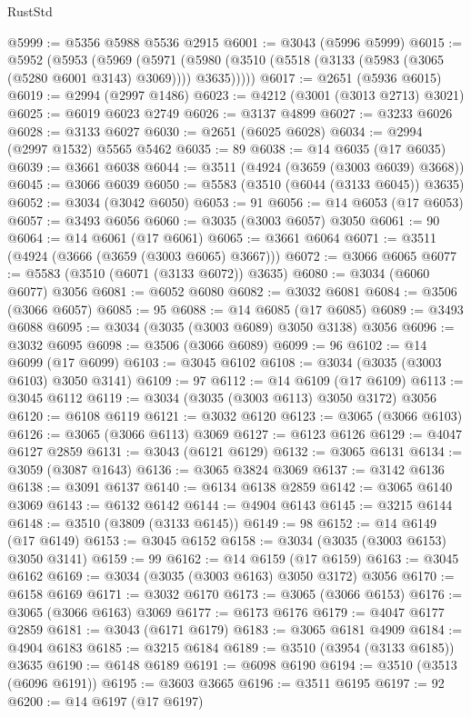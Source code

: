 \begin{lexlean}{RustStd}
\begin{coremodule}
@5999 := @5356 @5988 @5536 @2915
@6001 := @3043 (@5996 @5999)
@6015 := @5952
    (@5953
      (@5969
        (@5971 (@5980 (@3510 (@5518 (@3133 (@5983 (@3065 (@5280 @6001 @3143) @3069)))) @3635)))))
@6017 := @2651 (@5936 @6015)
@6019 := @2994 (@2997 @1486)
@6023 := @4212 (@3001 (@3013 @2713) @3021)
@6025 := @6019 @6023 @2749
@6026 := @3137 @4899
@6027 := @3233 @6026
@6028 := @3133 @6027
@6030 := @2651 (@6025 @6028)
@6034 := @2994 (@2997 @1532) @5565 @5462
@6035 := 89
@6038 := @14 @6035 (@17 @6035)
@6039 := @3661 @6038
@6044 := @3511 (@4924 (@3659 (@3003 @6039) @3668))
@6045 := @3066 @6039
@6050 := @5583 (@3510 (@6044 (@3133 @6045)) @3635)
@6052 := @3034 (@3042 @6050)
@6053 := 91
@6056 := @14 @6053 (@17 @6053)
@6057 := @3493 @6056
@6060 := @3035 (@3003 @6057) @3050
@6061 := 90
@6064 := @14 @6061 (@17 @6061)
@6065 := @3661 @6064
@6071 := @3511 (@4924 (@3666 (@3659 (@3003 @6065) @3667)))
@6072 := @3066 @6065
@6077 := @5583 (@3510 (@6071 (@3133 @6072)) @3635)
@6080 := @3034 (@6060 @6077) @3056
@6081 := @6052 @6080
@6082 := @3032 @6081
@6084 := @3506 (@3066 @6057)
@6085 := 95
@6088 := @14 @6085 (@17 @6085)
@6089 := @3493 @6088
@6095 := @3034 (@3035 (@3003 @6089) @3050 @3138) @3056
@6096 := @3032 @6095
@6098 := @3506 (@3066 @6089)
@6099 := 96
@6102 := @14 @6099 (@17 @6099)
@6103 := @3045 @6102
@6108 := @3034 (@3035 (@3003 @6103) @3050 @3141)
@6109 := 97
@6112 := @14 @6109 (@17 @6109)
@6113 := @3045 @6112
@6119 := @3034 (@3035 (@3003 @6113) @3050 @3172) @3056
@6120 := @6108 @6119
@6121 := @3032 @6120
@6123 := @3065 (@3066 @6103)
@6126 := @3065 (@3066 @6113) @3069
@6127 := @6123 @6126
@6129 := @4047 @6127 @2859
@6131 := @3043 (@6121 @6129)
@6132 := @3065 @6131
@6134 := @3059 (@3087 @1643)
@6136 := @3065 @3824 @3069
@6137 := @3142 @6136
@6138 := @3091 @6137
@6140 := @6134 @6138 @2859
@6142 := @3065 @6140 @3069
@6143 := @6132 @6142
@6144 := @4904 @6143
@6145 := @3215 @6144
@6148 := @3510 (@3809 (@3133 @6145))
@6149 := 98
@6152 := @14 @6149 (@17 @6149)
@6153 := @3045 @6152
@6158 := @3034 (@3035 (@3003 @6153) @3050 @3141)
@6159 := 99
@6162 := @14 @6159 (@17 @6159)
@6163 := @3045 @6162
@6169 := @3034 (@3035 (@3003 @6163) @3050 @3172) @3056
@6170 := @6158 @6169
@6171 := @3032 @6170
@6173 := @3065 (@3066 @6153)
@6176 := @3065 (@3066 @6163) @3069
@6177 := @6173 @6176
@6179 := @4047 @6177 @2859
@6181 := @3043 (@6171 @6179)
@6183 := @3065 @6181 @4909
@6184 := @4904 @6183
@6185 := @3215 @6184
@6189 := @3510 (@3954 (@3133 @6185)) @3635
@6190 := @6148 @6189
@6191 := @6098 @6190
@6194 := @3510 (@3513 (@6096 @6191))
@6195 := @3603 @3665
@6196 := @3511 @6195
@6197 := 92
@6200 := @14 @6197 (@17 @6197)

\end{coremodule}
\end{lexlean}
